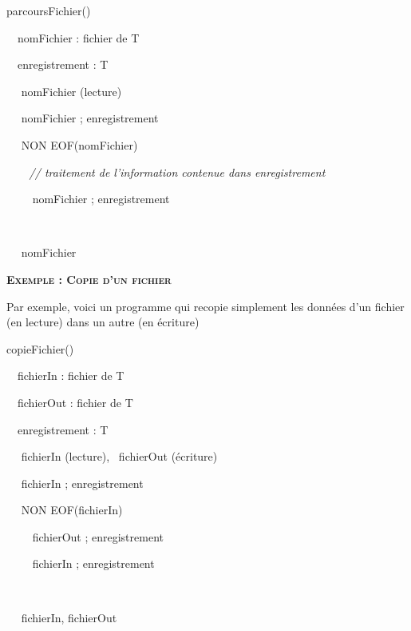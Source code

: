 {\sffamily
{} parcoursFichier()}

{\sffamily
\ \ nomFichier : fichier de T }

{\sffamily
\ \ enregistrement : T }

{\sffamily
\ \  nomFichier (lecture) }

{\sffamily
\ \  nomFichier ; enregistrement }

{\sffamily
\ \   NON EOF(nomFichier)
 }

{\sffamily\itshape
\ \ \ \ // traitement de l’information contenue dans enregistrement}

{\sffamily
\ \ \ \  nomFichier ; enregistrement }

{\sffamily
\ \    }

{\sffamily
\ \  nomFichier }

{\sffamily
{}}


\bigskip

{\sffamily\bfseries\scshape
Exemple : Copie d'un fichier}

{
Par exemple, voici un programme qui recopie simplement les données
d'un fichier (en lecture) dans un autre (en écriture)
}

{\sffamily
{} copieFichier() }

{\sffamily
\ \ fichierIn : fichier de T }

{\sffamily
\ \ fichierOut : fichier de T }

{\sffamily
\ \ enregistrement : T }

{\sffamily
\ \  fichierIn (lecture), \ fichierOut
(écriture)}

{\sffamily
\ \  fichierIn ; enregistrement }

{\sffamily
\ \   NON EOF(fichierIn)
 }

{\sffamily
\ \ \ \  fichierOut ; enregistrement}

{\sffamily
\ \ \ \  fichierIn ; enregistrement }

{\sffamily
\ \    }

{\sffamily
\ \  fichierIn, fichierOut }

